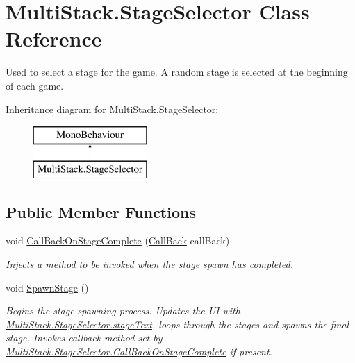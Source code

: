 \hypertarget{class_multi_stack_1_1_stage_selector}{}\section{Multi\+Stack.\+Stage\+Selector Class Reference}
\label{class_multi_stack_1_1_stage_selector}


Used to select a stage for the game. A random stage is selected at the beginning of each game.  


Inheritance diagram for Multi\+Stack.\+Stage\+Selector\+:\begin{figure}[H]
\begin{center}
\leavevmode
\includegraphics[height=2.000000cm]{class_multi_stack_1_1_stage_selector}
\end{center}
\end{figure}
\subsection*{Public Member Functions}
\begin{DoxyCompactItemize}
\item 
void \hyperlink{class_multi_stack_1_1_stage_selector_aca29f790cecb0ac7e2b6244ac0d1a6c9}{Call\+Back\+On\+Stage\+Complete} (\hyperlink{namespace_multi_stack_a4bd4097b52deebcafccf5815a8495960}{Call\+Back} call\+Back)
\begin{DoxyCompactList}\small\item\em Injects a method to be invoked when the stage spawn has completed. \end{DoxyCompactList}\item 
void \hyperlink{class_multi_stack_1_1_stage_selector_abee538fc62118823508d31ebff5a68d0}{Spawn\+Stage} ()
\begin{DoxyCompactList}\small\item\em Begins the stage spawning process. Updates the U\+I with \hyperlink{class_multi_stack_1_1_stage_selector_a199ae7412400d6e934dba1d2dc6b4f45}{Multi\+Stack.\+Stage\+Selector.\+stage\+Text}, loops through the stages and spawns the final stage. Invokes callback method set by \hyperlink{class_multi_stack_1_1_stage_selector_aca29f790cecb0ac7e2b6244ac0d1a6c9}{Multi\+Stack.\+Stage\+Selector.\+Call\+Back\+On\+Stage\+Complete} if present. \end{DoxyCompactList}\end{DoxyCompactItemize}

